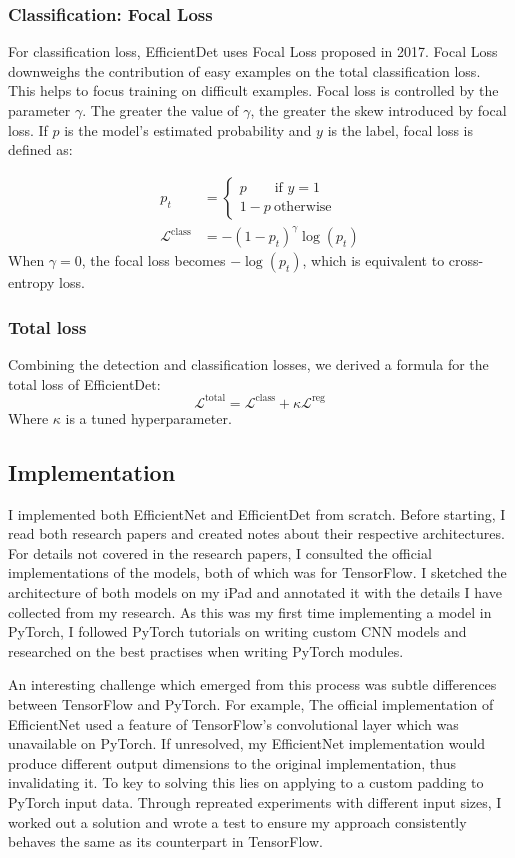 \documentclass[12pt,a4paper,twoside,openany]{report}
\newcommand{\clsloss}{\mathcal{L}^\text{class}}
\newcommand{\regloss}{\mathcal{L}^\text{reg}}
\begin{document}
\subsubsection{Classification: Focal Loss}
For classification loss, EfficientDet uses Focal Loss \cite{lin_focal_2018} proposed in 2017. Focal Loss downweighs the contribution of easy examples on the total classification loss. This helps to focus training on difficult examples. Focal loss is controlled by the parameter $\gamma$. The greater the value of $\gamma$, the greater the skew introduced by focal loss. If $p$ is the model's estimated probability and $y$ is the label, focal loss is defined as:


\begin{align}\label{eq:focal}
p_t&=\begin{cases}
    p\quad\quad\text{if }y=1\\
    1-p\ \text{otherwise}
    \end{cases}\\
\clsloss &= -(1-p_t)^\gamma \log(p_t)
\end{align}
When $\gamma=0$, the focal loss becomes $-\log(p_t)$, which is equivalent to cross-entropy loss.

\subsubsection{Total loss}
Combining the detection and classification losses, we derived a formula for the total loss of EfficientDet:
$$
\mathcal{L}^{\text{total}} = \clsloss + \kappa\regloss
$$
 Where $\kappa$ is a tuned hyperparameter. 

\subsection{Implementation}
I implemented both EfficientNet and EfficientDet from scratch. Before starting, I read both research papers and created notes about their respective architectures. For details not covered in the research papers, I consulted the official implementations of the models, both of which was for TensorFlow. I sketched the architecture of both models on my iPad and annotated it with the details I have collected from my research. As this was my first time implementing a model in PyTorch, I followed PyTorch tutorials on writing custom CNN models and researched on the best practises when writing PyTorch modules.

An interesting challenge which emerged from this process was subtle differences between TensorFlow and PyTorch. For example, The official implementation of EfficientNet used a feature of TensorFlow's convolutional layer which was unavailable on PyTorch. If unresolved, my EfficientNet implementation would produce different output dimensions to the original implementation, thus invalidating it. To key to solving this lies on applying to a custom padding to PyTorch input data. Through repreated experiments with different input sizes, I worked out a solution and wrote a test to ensure my approach consistently behaves the same as its counterpart in TensorFlow. 
\end{document}
